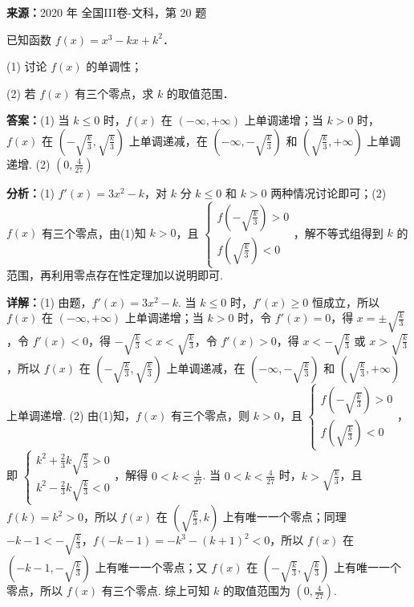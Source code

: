 \begin{question}[points=12]
\textbf{来源：}2020 年 全国III卷-文科，第 20 题\par
已知函数 $f(x)=x^3-kx+k^2$．

(1) 讨论 $f(x)$ 的单调性；

(2) 若 $f(x)$ 有三个零点，求 $k$ 的取值范围．
\begin{solution}
\textbf{答案：}(1) 当 $k\leq0$ 时，$f(x)$ 在 $(-\infty,+\infty)$ 上单调递增；当 $k>0$ 时，$f(x)$ 在 $(-\sqrt{\frac{k}{3}},\sqrt{\frac{k}{3}})$ 上单调递减，在 $(-\infty,-\sqrt{\frac{k}{3}})$ 和 $(\sqrt{\frac{k}{3}},+\infty)$ 上单调递增. (2) $(0,\frac{4}{27})$

\textbf{分析：}(1) $f'(x)=3x^2-k$，对 $k$ 分 $k\leq0$ 和 $k>0$ 两种情况讨论即可；(2) $f(x)$ 有三个零点，由(1)知 $k>0$，且 $\begin{cases} f(-\sqrt{\frac{k}{3}})>0 \\ f(\sqrt{\frac{k}{3}})<0 \end{cases}$，解不等式组得到 $k$ 的范围，再利用零点存在性定理加以说明即可.

\textbf{详解：}(1) 由题，$f'(x)=3x^2-k$. 当 $k\leq0$ 时，$f'(x)\geq0$ 恒成立，所以 $f(x)$ 在 $(-\infty,+\infty)$ 上单调递增；当 $k>0$ 时，令 $f'(x)=0$，得 $x=\pm\sqrt{\frac{k}{3}}$，令 $f'(x)<0$，得 $-\sqrt{\frac{k}{3}}<x<\sqrt{\frac{k}{3}}$，令 $f'(x)>0$，得 $x<-\sqrt{\frac{k}{3}}$ 或 $x>\sqrt{\frac{k}{3}}$，所以 $f(x)$ 在 $(-\sqrt{\frac{k}{3}},\sqrt{\frac{k}{3}})$ 上单调递减，在 $(-\infty,-\sqrt{\frac{k}{3}})$ 和 $(\sqrt{\frac{k}{3}},+\infty)$ 上单调递增.
(2) 由(1)知，$f(x)$ 有三个零点，则 $k>0$，且 $\begin{cases} f(-\sqrt{\frac{k}{3}})>0 \\ f(\sqrt{\frac{k}{3}})<0 \end{cases}$，即 $\begin{cases} k^2+\frac{2}{3}k\sqrt{\frac{k}{3}}>0 \\ k^2-\frac{2}{3}k\sqrt{\frac{k}{3}}<0 \end{cases}$，解得 $0<k<\frac{4}{27}$. 当 $0<k<\frac{4}{27}$ 时，$k>\sqrt{\frac{k}{3}}$，且 $f(k)=k^2>0$，所以 $f(x)$ 在 $(\sqrt{\frac{k}{3}},k)$ 上有唯一一个零点；同理 $-k-1<-\sqrt{\frac{k}{3}}$，$f(-k-1)=-k^3-(k+1)^2<0$，所以 $f(x)$ 在 $(-k-1,-\sqrt{\frac{k}{3}})$ 上有唯一一个零点；又 $f(x)$ 在 $(-\sqrt{\frac{k}{3}},\sqrt{\frac{k}{3}})$ 上有唯一一个零点，所以 $f(x)$ 有三个零点. 综上可知 $k$ 的取值范围为 $(0,\frac{4}{27})$.
\end{solution}
\end{question}

